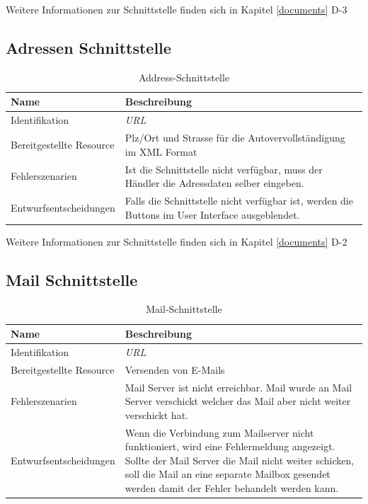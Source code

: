 Weitere Informationen zur Schnittstelle finden sich in Kapitel \ref{documents} D-3

\subsection{Adressen Schnittstelle}

\begin{table}[H]
	\centering
	\caption{Address-Schnittstelle}
	\begin{tabular}{  | p{4cm} | p{11cm} |}
		\toprule
		{\textbf{Name}} & {\textbf{Beschreibung}} \\
		\midrule
		Identifikation & \textit{\gls{URL}} \\ \hline
		Bereitgestellte Resource & Plz/Ort und Strasse für die Autovervollständigung im XML Format \\ \hline
		Fehlerszenarien & Ist die Schnittstelle nicht verfügbar, muss der Händler die Adressdaten selber eingeben.\\ \hline
		Entwurfsentscheidungen & Falls die Schnittstelle nicht verfügbar ist, werden die Buttons im User Interface ausgeblendet.\\
		\bottomrule
	\end{tabular}
\end{table}

Weitere Informationen zur Schnittstelle finden sich in Kapitel \ref{documents} D-2

\subsection{Mail Schnittstelle}

\begin{table}[H]
	\centering
	\caption{Mail-Schnittstelle}
	\begin{tabular}{ | p{4cm} | p{11cm} |}
		\toprule
		{\textbf{Name}} & {\textbf{Beschreibung}} \\
		\midrule
		Identifikation & \textit{\gls{URL}} \\ \hline
		Bereitgestellte Resource & Versenden von E-Mails\\ \hline
		Fehlerszenarien & Mail Server ist nicht erreichbar. Mail wurde an Mail Server verschickt welcher das Mail aber nicht weiter verschickt hat.\\ \hline
		Entwurfsentscheidungen & Wenn die Verbindung zum Mailserver nicht funktioniert, wird eine Fehlermeldung angezeigt. Sollte der Mail Server die Mail nicht weiter schicken, soll die Mail an eine separate Mailbox gesendet werden damit der Fehler behandelt werden kann.\\
		\bottomrule
	\end{tabular}
\end{table}

